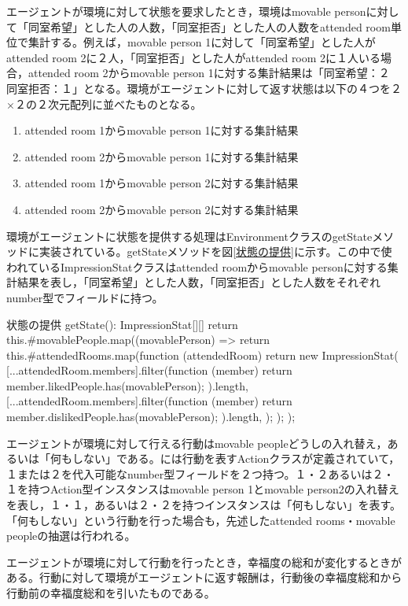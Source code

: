 \documentclass[titlepage]{ltjsreport}
\begin{document}
エージェントが環境に対して状態を要求したとき，環境はmovable personに対して「同室希望」とした人の人数，「同室拒否」とした人の人数をattended room単位で集計する。例えば，movable person 1に対して「同室希望」とした人がattended room 2に２人，「同室拒否」とした人がattended room 2に１人いる場合，attended room 2からmovable person 1に対する集計結果は「同室希望：２　同室拒否：１」となる。環境がエージェントに対して返す状態は以下の４つを２×２の２次元配列に並べたものとなる。
\begin{enumerate}
\item attended room 1からmovable person 1に対する集計結果
\item attended room 2からmovable person 1に対する集計結果
\item attended room 1からmovable person 2に対する集計結果
\item attended room 2からmovable person 2に対する集計結果
\end{enumerate}

環境がエージェントに状態を提供する処理はEnvironmentクラスのgetStateメソッドに実装されている。getStateメソッドを図\ref{状態の提供}に示す。この中で使われているImpressionStatクラスはattended roomからmovable personに対する集計結果を表し，「同室希望」とした人数，「同室拒否」とした人数をそれぞれnumber型でフィールドに持つ。
\begin{textbox}{状態の提供}
getState(): ImpressionStat[][] {
	return this.#movablePeople.map((movablePerson) => {
		return this.#attendedRooms.map(function (attendedRoom) {
			return new ImpressionStat(
			[...attendedRoom.members].filter(function (member) {
				return member.likedPeople.has(movablePerson);
			}).length,
			[...attendedRoom.members].filter(function (member) {
				return member.dislikedPeople.has(movablePerson);
			}).length,
			);
		});
	});
}
\end{textbox}

エージェントが環境に対して行える行動はmovable peopleどうしの入れ替え，あるいは「何もしない」である。\cite{環境}には行動を表すActionクラスが定義されていて，１または２を代入可能なnumber型フィールドを２つ持つ。１・２あるいは２・１を持つAction型インスタンスはmovable person 1とmovable person2の入れ替えを表し，１・１，あるいは２・２を持つインスタンスは「何もしない」を表す。「何もしない」という行動を行った場合も，先述したattended rooms・movable peopleの抽選は行われる。

エージェントが環境に対して行動を行ったとき，幸福度の総和が変化するときがある。行動に対して環境がエージェントに返す報酬は，行動後の幸福度総和から行動前の幸福度総和を引いたものである。
\end{document}
